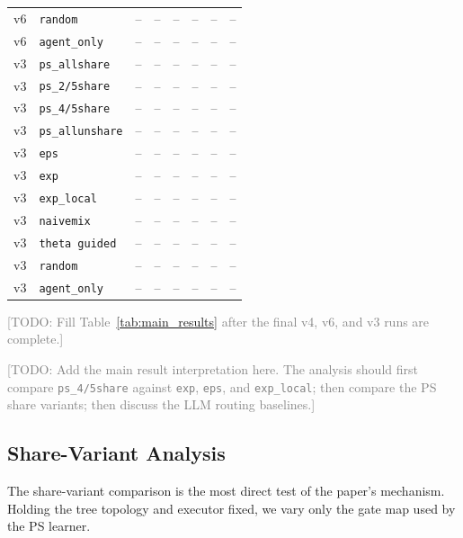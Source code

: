 \begin{table}[t]
\begin{tabular}{llcccccc}
        v6 & \texttt{random} & -- & -- & -- & -- & -- & -- \\
        v6 & \texttt{agent\_only} & -- & -- & -- & -- & -- & -- \\
        \midrule
        v3 & \texttt{ps\_allshare} & -- & -- & -- & -- & -- & -- \\
        v3 & \texttt{ps\_2/5share} & -- & -- & -- & -- & -- & -- \\
        v3 & \texttt{ps\_4/5share} & -- & -- & -- & -- & -- & -- \\
        v3 & \texttt{ps\_allunshare} & -- & -- & -- & -- & -- & -- \\
        v3 & \texttt{eps} & -- & -- & -- & -- & -- & -- \\
        v3 & \texttt{exp} & -- & -- & -- & -- & -- & -- \\
        v3 & \texttt{exp\_local} & -- & -- & -- & -- & -- & -- \\
        v3 & \texttt{naivemix} & -- & -- & -- & -- & -- & -- \\
        v3 & \texttt{theta guided} & -- & -- & -- & -- & -- & -- \\
        v3 & \texttt{random} & -- & -- & -- & -- & -- & -- \\
        v3 & \texttt{agent\_only} & -- & -- & -- & -- & -- & -- \\
        \bottomrule
    \end{tabular}
\end{table}

\textcolor{gray}{[TODO: Fill Table~\ref{tab:main_results} after the final v4, v6, and v3 runs are complete.]}

\textcolor{gray}{[TODO: Add the main result interpretation here. The analysis should first compare \texttt{ps\_4/5share} against \texttt{exp}, \texttt{eps}, and \texttt{exp\_local}; then compare the PS share variants; then discuss the LLM routing baselines.]}

\subsection{Share-Variant Analysis}
\label{sec:exp_share_variant_analysis}

The share-variant comparison is the most direct test of the paper's mechanism. Holding the tree topology and executor fixed, we vary only the gate map used by the PS learner.

